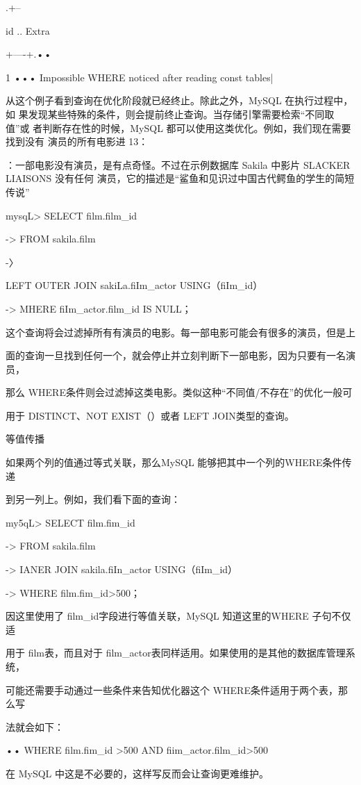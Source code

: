 .+--

id .. Extra

+----+.••

1 ••• Impossible WHERE noticed after reading const tables|

从这个例子看到查询在优化阶段就已经终止。除此之外，MySQL 在执行过程中，如
果发现某些特殊的条件，则会提前终止查询。当存储引擎需要检索“不同取值”或
者判断存在性的时候，MySQL 都可以使用这类优化。例如，我们现在需要找到没有
演员的所有电影进 13：

：一部电影没有演员，是有点奇怪。不过在示例数据库 Sakila 中影片 SLACKER LIAISONS 没有任何
演员，它的描述是“鲨鱼和见识过中国古代鳄鱼的学生的简短传说”

mysqL> SELECT film.film\_id

-> FROM sakila.film

-〉

LEFT OUTER JOIN sakiLa.fiIm\_actor USING（fiIm\_id）

-> MHERE fiIm\_actor.film\_id IS NULL；

这个查询将会过滤掉所有有演员的电影。每一部电影可能会有很多的演员，但是上

面的查询一旦找到任何一个，就会停止并立刻判断下一部电影，因为只要有一名演员，

那么 WHERE条件则会过滤掉这类电影。类似这种“不同值/不存在”的优化一般可

用于 DISTINCT、NOT EXIST（）或者 LEFT JOIN类型的查询。

等值传播

如果两个列的值通过等式关联，那么MySQL 能够把其中一个列的WHERE条件传递

到另一列上。例如，我们看下面的查询：

my5qL> SELECT film.fim\_id

-> FROM sakila.film

-> IANER JOIN sakila.fiIn\_actor USING（fiIm\_id）

-> WHERE film.fim\_id>500；

因这里使用了 film\_id字段进行等值关联，MySQL 知道这里的WHERE 子句不仅适

用于 film表，而且对于 film\_actor表同样适用。如果使用的是其他的数据库管理系统，

可能还需要手动通过一些条件来告知优化器这个 WHERE条件适用于两个表，那么写

法就会如下：

•• WHERE film.fim\_id >500 AND fiim\_actor.film\_id>500

在 MySQL 中这是不必要的，这样写反而会让查询更难维护。

